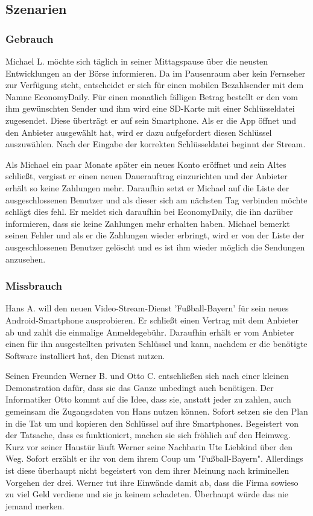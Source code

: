 \documentclass[a4paper,10pt]{scrartcl}
\begin{document}
\subsection{Szenarien}

\subsubsection{Gebrauch}
Michael L. möchte sich täglich in seiner Mittagspause über die neusten Entwicklungen an der Börse informieren. 
Da im Pausenraum aber kein Fernseher zur Verfügung steht, entscheidet er sich für einen mobilen Bezahlsender mit dem Namne EconomyDaily. 
Für einen monatlich fälligen Betrag bestellt er den vom ihm gewünschten Sender und ihm wird eine SD-Karte mit einer Schlüsseldatei zugesendet. 
Diese überträgt er auf sein Smartphone. Als er die App öffnet und den Anbieter ausgewählt hat, wird er dazu aufgefordert diesen Schlüssel auszuwählen. 
Nach der Eingabe der korrekten Schlüsseldatei beginnt der Stream. 

Als Michael ein paar Monate später ein neues Konto eröffnet und sein Altes schließt, vergisst er einen neuen Dauerauftrag einzurichten und der Anbieter erhält so keine Zahlungen mehr. 
Daraufhin setzt er Michael auf die Liste der ausgeschlossenen Benutzer und als dieser sich am nächsten Tag verbinden möchte schlägt dies fehl. 
Er meldet sich daraufhin bei EconomyDaily, die ihn darüber informieren, dass sie keine Zahlungen mehr erhalten haben. 
Michael bemerkt seinen Fehler und als er die Zahlungen wieder erbringt, wird er von der Liste der ausgeschlossenen Benutzer gelöscht und es ist ihm wieder möglich die Sendungen anzusehen.

\subsubsection{Missbrauch}
Hans A. will den neuen Video-Stream-Dienst 'Fußball-Bayern' für sein neues Android-Smartphone ausprobieren. Er schließt einen Vertrag mit dem Anbieter ab und zahlt die einmalige Anmeldegebühr. Daraufhin erhält er vom Anbieter einen für ihn ausgestellten privaten Schlüssel und kann, nachdem er die benötigte Software installiert hat, den Dienst nutzen.

Seinen Freunden Werner B. und Otto C. entschließen sich nach einer kleinen Demonstration dafür, dass sie das Ganze unbedingt auch benötigen.
Der Informatiker Otto kommt auf die Idee, dass sie, anstatt jeder zu zahlen, auch gemeinsam die Zugangsdaten von Hans nutzen können.
Sofort setzen sie den Plan in die Tat um und kopieren den Schlüssel auf ihre Smartphones. Begeistert von der Tatsache, dass es funktioniert,
machen sie sich fröhlich auf den Heimweg. Kurz vor seiner Haustür läuft Werner seine Nachbarin Ute Liebkind über den Weg. Sofort erzählt
er ihr von dem ihrem Coup um "Fußball-Bayern". Allerdings ist diese überhaupt nicht begeistert von dem ihrer Meinung nach kriminellen
Vorgehen der drei. Werner tut ihre Einwände damit ab, dass die Firma sowieso zu viel Geld verdiene und sie ja keinem schadeten.
Überhaupt würde das nie jemand merken.
\end{document}
